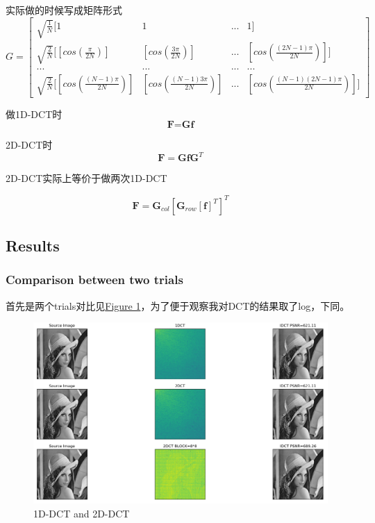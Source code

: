 \documentclass[UTF8]{ctexart}
\begin{document}
	实际做的时候写成矩阵形式
	\begin{equation*}
	G=\begin{bmatrix} \sqrt{\frac{1}{N}}[1&1&...&1]\\
	\sqrt{\frac{2}{N}}[[cos(\frac{\pi}{2N})]&[cos(\frac{3\pi}{2N})]&...&[cos(\frac{(2N-1)\pi}{2N})]] \\
	...&...&...&...\\
	\sqrt{\frac{2}{N}}[[cos(\frac{(N-1)\pi}{2N})]&[cos(\frac{(N-1)3\pi}{2N})]&...&[cos(\frac{(N-1)(2N-1)\pi}{2N})]]
	\end{bmatrix}
	\end{equation*}
	
	做1D-DCT时
	\begin{equation*}
	\textbf{F}=\textbf{G}\textbf{f}
	\end{equation*}
	
	2D-DCT时
	\begin{equation*}
	\textbf{F}=\textbf{G}\textbf{f}\textbf{G}^T
	\end{equation*}
	
	2D-DCT实际上等价于做两次1D-DCT
	
	\begin{equation*}
	\textbf{F} = \textbf{G}_{col}[\textbf{G}_{row}[\textbf{f}]^T]^T
	\end{equation*}
	
	\subsection{Results}
	
	\subsubsection{Comparison between two trials} 
	
	首先是两个trials对比见\hyperref[Fig.part1-1-1]{Figure 1}，为了便于观察我对DCT的结果取了log，下同。
	
	\begin{figure}[htbp]
		\centering
		\includegraphics[width=1.0\textwidth]{../part1-1-1.png}
		\caption{1D-DCT and 2D-DCT}
		\label{Fig.part1-1-1}
	\end{figure}
	
\end{document}
